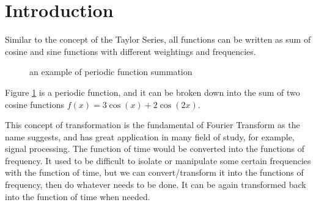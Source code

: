\section{Introduction}
\indent Similar to the concept of the Taylor Series, 
all functions can be written as sum of cosine and sine 
functions with different weightings and frequencies. 

\vspace{25pt}
\begin{figure}[h]
\caption{an example of periodic function summation}
\label{fig:intro_example}
\end{figure}
\vspace{25pt}

\indent Figure \ref{fig:intro_example} is a periodic function, and it can be broken down into 
the sum of two cosine functions $f(x)=3\cos(x)+2\cos(2x)$.  %

This concept of transformation is the fundamental of Fourier Transform as the name suggests,
and has great application in many field of study, for example, signal processing. 
The function of time would be converted into the functions of frequency. 
It used to be difficult to isolate or manipulate some certain frequencies with the function of time, 
but we can convert/transform it into the functions of frequency, then do whatever needs to be done. 
It can be again transformed back into the function of time when needed.
